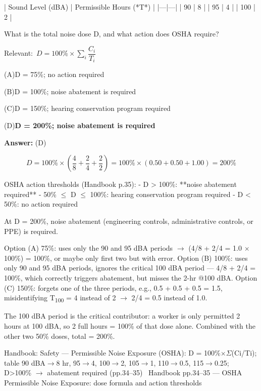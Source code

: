\documentclass[11pt]{article}
\newcommand{\correct}[1]{\textbf{#1}\;{\color{accent}$\checkmark$}}
\newcommand{\optline}[2]{\par\noindent\hspace{1.2em}(#1)\hspace{0.6em}#2}
\begin{document}
| Sound Level (dBA) | Permissible Hours (*T*) |
|---|---|
| 90 | 8 |
| 95 | 4 |
| 100 | 2 |

What is the total noise dose D, and what action does OSHA require?\par\vspace{3pt}
{\small\color{soft}Relevant:}\ $D = 100\% \times \sum_i \dfrac{C_i}{T_i}$\par\vspace{3pt}
\optline{A}{D = 75\%; no action required}
\optline{B}{D = 100\%; noise abatement is required}
\optline{C}{D = 150\%; hearing conservation program required}
\optline{D}{\correct{D = 200\%; noise abatement is required}}
\par\vspace{3pt}
\vspace{2pt}\par\noindent\colorbox{boxbg}{\parbox{\dimexpr\linewidth-2\fboxsep\relax}{%
\vspace{2pt}\textbf{Answer:} (D)\par\vspace{2pt}
{\small \[D = 100\% \times \left(\frac{4}{8} + \frac{2}{4} + \frac{2}{2}\right) = 100\% \times (0.50 + 0.50 + 1.00) = 200\%\]

OSHA action thresholds (Handbook p.35):
- D > 100\%: **noise abatement required**
- 50\% $\le$ D $\le$ 100\%: hearing conservation program required
- D < 50\%: no action required

At D = 200\%, noise abatement (engineering controls, administrative controls, or PPE) is required.

Option (A) 75\%: uses only the 90 and 95 dBA periods $\rightarrow$ (4/8 + 2/4 = 1.0 $\times$ 100\%) = 100\%, or maybe only first two but with error. Option (B) 100\%: uses only 90 and 95 dBA periods, ignores the critical 100 dBA period --- 4/8 + 2/4 = 100\%, which correctly triggers abatement, but misses the 2-hr @100 dBA. Option (C) 150\%: forgets one of the three periods, e.g., 0.5 + 0.5 + 0.5 = 1.5, misidentifying T\textsubscript{1}\textsubscript{0}\textsubscript{0} = 4 instead of 2 $\rightarrow$ 2/4 = 0.5 instead of 1.0.

The 100 dBA period is the critical contributor: a worker is only permitted 2 hours at 100 dBA, so 2 full hours = 100\% of that dose alone. Combined with the other two 50\% doses, total = 200\%.}\par\vspace{2pt}
{\footnotesize\color{soft}Handbook: Safety --- Permissible Noise Exposure (OSHA): D = 100\%$\times$$\Sigma$(Ci/Ti); table 90 dBA$\rightarrow$8 hr, 95$\rightarrow$4, 100$\rightarrow$2, 105$\rightarrow$1, 110$\rightarrow$0.5, 115$\rightarrow$0.25; D>100\% $\rightarrow$ abatement required (pp.34--35) \textbullet\ Handbook pp.34--35 --- OSHA Permissible Noise Exposure: dose formula and action thresholds}\vspace{2pt}
}}
\end{document}
